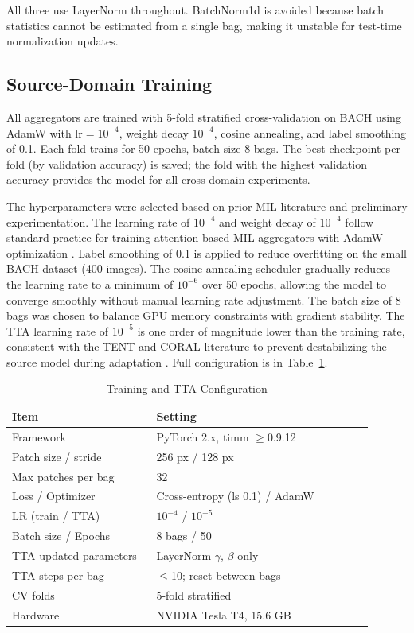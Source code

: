 \documentclass[conference]{IEEEtran}
\begin{document}
All three use LayerNorm throughout. BatchNorm1d is avoided because batch statistics cannot be estimated from a single bag, making it unstable for test-time normalization updates.

\subsection{Source-Domain Training}

All aggregators are trained with 5-fold stratified cross-validation on BACH using AdamW \cite{loshchilov2019decoupled} with $\text{lr}=10^{-4}$, weight decay $10^{-4}$, cosine annealing, and label smoothing of 0.1. Each fold trains for 50 epochs, batch size 8 bags. The best checkpoint per fold (by validation accuracy) is saved; the fold with the highest validation accuracy provides the model for all cross-domain experiments.

The hyperparameters were selected based on prior MIL literature and preliminary experimentation. The learning rate of $10^{-4}$ and weight decay of $10^{-4}$ follow standard practice for training attention-based MIL aggregators with AdamW optimization \cite{lu2021data, shao2021transmil}. Label smoothing of 0.1 is applied to reduce overfitting on the small BACH dataset (400 images). The cosine annealing scheduler gradually reduces the learning rate to a minimum of $10^{-6}$ over 50 epochs, allowing the model to converge smoothly without manual learning rate adjustment. The batch size of 8 bags was chosen to balance GPU memory constraints with gradient stability. The TTA learning rate of $10^{-5}$ is one order of magnitude lower than the training rate, consistent with the TENT and CORAL literature to prevent destabilizing the source model during adaptation \cite{wang2021tent, sun2016coral}. Full configuration is in Table~\ref{tab:training}.

\begin{table}[!hbt]
\caption{Training and TTA Configuration}
\label{tab:training}
\centering
\begin{tabular}{p{0.36\linewidth} p{0.54\linewidth}}
\toprule
\textbf{Item} & \textbf{Setting} \\
\midrule
Framework & PyTorch 2.x, timm $\geq$0.9.12 \\
Patch size / stride & 256 px / 128 px \\
Max patches per bag & 32 \\
Loss / Optimizer & Cross-entropy (ls 0.1) / AdamW \\
LR (train / TTA) & $10^{-4}$ / $10^{-5}$ \\
Batch size / Epochs & 8 bags / 50 \\
TTA updated parameters & LayerNorm $\gamma$, $\beta$ only \\
TTA steps per bag & $\leq$10; reset between bags \\
CV folds & 5-fold stratified \\
Hardware & NVIDIA Tesla T4, 15.6 GB \\
\bottomrule
\end{tabular}
\end{table}
\end{document}
